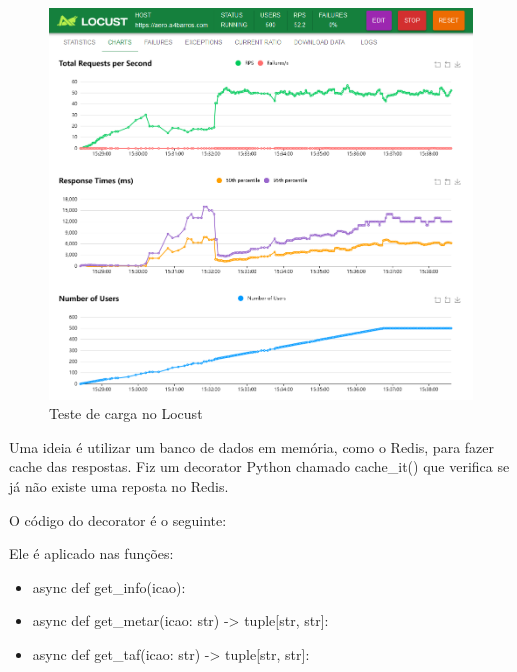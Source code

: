 \begin{figure}[ht]
    \begin{center}
    \includegraphics[width=400pt]{img/locust-no-cache.png}
    \caption{Teste de carga no Locust}
    \label{fig:locust-no-cache}
    \end{center}
\end{figure}


Uma ideia é utilizar um banco de dados em memória, como o Redis, para fazer 
cache das respostas. Fiz um decorator Python chamado cache\_it() que verifica se
já não existe uma reposta no Redis. 

O código do decorator é o seguinte:

\begin{minipage}{\linewidth}

\end{minipage}

Ele é aplicado nas funções:

\begin{itemize}
    \item async def get\_info(icao):
    \item async def get\_metar(icao: str) -> tuple[str, str]:
    \item async def get\_taf(icao: str) -> tuple[str, str]:
\end{itemize}

